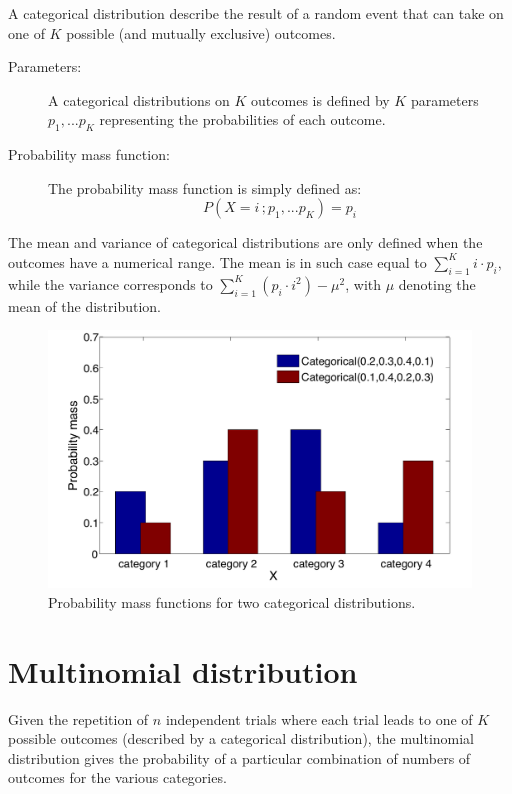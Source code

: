 A categorical distribution describe the result of a random event that can take on one of $K$ possible (and mutually exclusive) outcomes.

\begin{description}
\item [Parameters: ] A categorical distributions on $K$ outcomes is defined by $K$ parameters $p_1,...p_K$ representing the probabilities of each outcome.

\item [Probability mass function: ] The probability mass function is simply defined as:
\begin{equation}
P(X=i\,; p_1,... p_K) = p_i
\end{equation} 
\end{description}

The mean and variance of categorical distributions are only defined when the outcomes have a numerical range.  The mean is in such case equal to $\sum_{i=1}^{K} i \cdot p_i$, while the variance corresponds to $\sum_{i=1}^K (p_i\cdot i^2) - \mu^2$, with $\mu$ denoting the mean of the distribution.

\begin{figure}[h]
\centering
\includegraphics[scale=0.40]{imgs/categorical_appendix.pdf}
\caption{Probability mass functions for two categorical distributions.} 
\label{fig:categorical-appendix}
\end{figure}

\section*{Multinomial distribution}

Given the repetition of $n$ independent trials where each trial leads to one of $K$ possible outcomes (described by a categorical distribution), the multinomial distribution gives the probability of a particular combination of numbers of outcomes for the various categories. 

